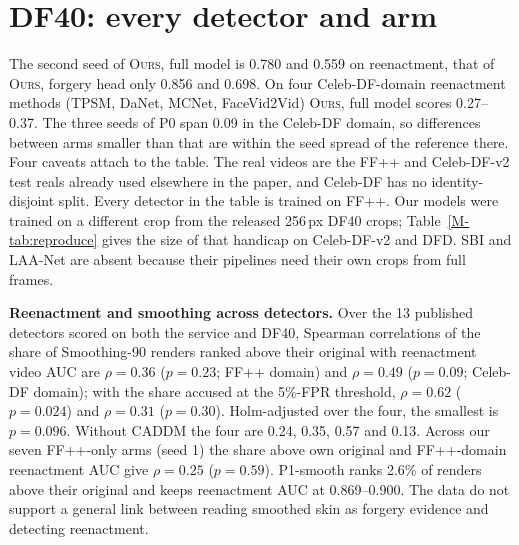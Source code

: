 \documentclass[10pt]{article}
\newcommand{\oursB}{\textsc{Ours}, forgery head only}
\newcommand{\oursF}{\textsc{Ours}, full model}
\begin{document}
\section{DF40: every detector and arm}
\label{sec:df40}
\begin{table}[H]
\centering
\caption{DF40 held-out, untreated. Video AUC (mean frame score per video), mean over methods, with 95\% bootstrap intervals over
videos. Real videos are the FF++ and Celeb-DF-v2 test reals; the 718 MobileSwap videos from FF++ training identities were removed;
140 fake videos per method in the Celeb-DF domain. FS: nine face-swap methods; FR: twelve reenactment methods. CADDM and the rows
from P0 downwards were scored after the first table had been read. Paired blocks: \oursB{} minus each detector with the video and
the identity interval of the identity-bootstrap script (Sec.~\ref{sec:identity}; Celeb-DF domain: video only, no identity labels),
and \oursF{} minus each detector with the video interval of the earlier version.}
\label{tab:v4df40full}
\scriptsize
\begin{adjustbox}{max width=\linewidth}\end{adjustbox}
\end{table}
The second seed of \oursF{} is 0.780 and 0.559 on reenactment, that of \oursB{} 0.856 and 0.698. On four Celeb-DF-domain
reenactment methods (TPSM, DaNet, MCNet, FaceVid2Vid) \oursF{} scores 0.27--0.37. The three seeds of P0 span 0.09 in the Celeb-DF domain, so differences between arms smaller
than that are within the seed spread of the reference there. Four caveats attach to the table. The real videos are the FF++ and
Celeb-DF-v2 test reals already used elsewhere in the paper, and Celeb-DF has no identity-disjoint split. Every detector in the table
is trained on FF++. Our models were trained on a different crop from the released 256\,px DF40 crops; Table~\ref{M-tab:reproduce}
gives the size of that handicap on Celeb-DF-v2 and DFD. SBI and LAA-Net are absent because their pipelines need their own crops from
full frames.

\textbf{Reenactment and smoothing across detectors.} Over the 13 published detectors scored on both the service and DF40, Spearman
correlations of the share of Smoothing-90 renders ranked above their original with reenactment video AUC are $\rho=0.36$
($p=0.23$; FF++ domain) and $\rho=0.49$ ($p=0.09$; Celeb-DF domain); with the share accused at the 5\%-FPR threshold, $\rho=0.62$
($p=0.024$) and $\rho=0.31$ ($p=0.30$). Holm-adjusted over the four, the smallest is $p=0.096$. Without CADDM the four are 0.24,
0.35, 0.57 and 0.13. Across our seven FF++-only arms (seed 1) the share above own original and FF++-domain reenactment AUC give
$\rho=0.25$ ($p=0.59$). P1-smooth ranks 2.6\% of renders above their original and keeps reenactment AUC at 0.869--0.900. The data
do not support a general link between reading smoothed skin as forgery evidence and detecting reenactment.
\end{document}
